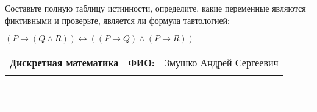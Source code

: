 \documentclass[10pt]{exam}
\newcommand{\class}{Дискретная математика}
\newcommand{\examdate}{}
\begin{document}
\begin{questions}
\begin{enumerate} [a)]
\end{enumerate}\question Составьте полную таблицу истинности, определите, какие переменные являются фиктивными и проверьте, является ли формула тавтологией:

$(P \rightarrow (Q \land R)) \leftrightarrow ((P \rightarrow Q) \land (P \rightarrow R))$

\end{questions}
\newpage
\begin{flushright}
\begin{tabular}{p{2.8in} r l}
\textbf{\class} & \textbf{ФИО:} &Змушко Андрей Сергеевич
\\

\textbf{\examdate} &&\\
\end{tabular}\\
\end{flushright}
\rule[1ex]{\textwidth}{.1pt}
\end{document}
